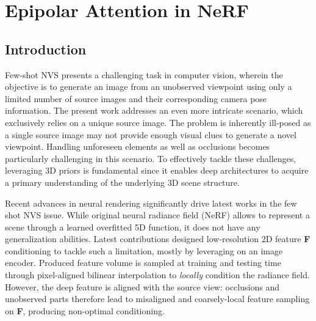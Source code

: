 \chapter{Epipolar Attention in NeRF}
\label{chapter:epinerf}





\section{Introduction}


Few-shot NVS presents a challenging task in computer vision, wherein the objective is to generate an image from an unobserved viewpoint using only a limited number of source images and their corresponding camera pose information. The present work addresses an even more intricate scenario, which exclusively relies on a unique source image. The problem is inherently ill-posed as a single source image may not provide enough visual clues to generate a novel viewpoint. Handling unforeseen elements as well as occlusions becomes particularly challenging in this scenario. To effectively tackle these challenges, leveraging 3D priors \citep{saito2019pifu,johari2022geonerf} is fundamental since it enables deep architectures to acquire a primary understanding of the underlying 3D scene structure. 

Recent advances in neural rendering \citep{tewari2022advances} significantly drive latest works in the few shot NVS issue. While original neural radiance field (NeRF) \citep{mildenhall2020nerf} allows to represent a scene through a learned overfitted 5D function, it does not have any generalization abilities. Latest contributions \citep{yu2021pixelnerf,li2022symmnerf,lin2023vision} designed low-resolution 2D feature \textbf{F} conditioning to tackle such a limitation, mostly by leveraging on an image encoder. Produced feature volume is sampled at training and testing time through pixel-aligned bilinear interpolation to \textit{locally} condition the radiance field. However, the deep feature is aligned with the source view: occlusions and unobserved parts therefore lead to misaligned and coarsely-local feature sampling on \textbf{F}, producing non-optimal conditioning. 

